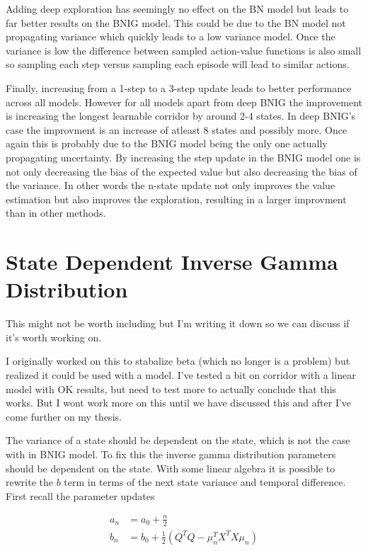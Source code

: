 Adding deep exploration has seemingly no effect on the BN model but leads to far better results on the BNIG model. This could be due to the BN model not propagating variance which quickly leads to a low variance model. Once the variance is low the difference between sampled action-value functions is also small so sampling each step versus sampling each episode will lead to similar actions.

Finally, increasing from a 1-step to a 3-step update leads to better performance across all models. However for all models apart from deep BNIG the improvement is increasing the longest learnable corridor by around 2-4 states. In deep BNIG's case the improvment is an increase of atleast 8 states and possibly more. Once again this is probably due to the BNIG model being the only one actually propagating uncertainty. By increasing the step update in the BNIG model one is not only decreasing the bias of the expected value but also decreasing the bias of the variance. In other words the n-state update not only improves the value estimation but also improves the exploration, resulting in a larger improvment than in other methods.

\section{\color{red}{Temp?} \color{black} State Dependent Inverse Gamma Distribution}

\todo This might not be worth including but I'm writing it down so we can discuss if it's worth working on.

\todo I originally worked on this to stabalize beta (which no longer is a problem) but realized it could be used with a model. I've tested a bit on corridor with a linear model with OK results, but need to test more to actually conclude that this works. But I wont work more on this until we have discussed this and after I've come further on my thesis.

The variance of a state should be dependent on the state, which is not the case with in BNIG model. To fix this the inverse gamma distribution parameters should be dependent on the state. With some linear algebra it is possible to rewrite the $b$ term in terms of the next state variance and temporal difference. First recall the parameter updates

\begin{align}
    a_n &= a_0 + \frac{n}{2} \\
    b_n &= b_0 + \frac{1}{2}(Q^TQ - \mu_n^TX^TX\mu_n)
\end{align}

